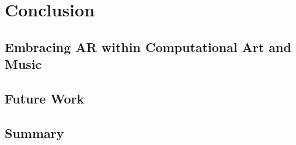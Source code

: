 \chapter{Conclusion}
\label{sec: conclusion}
\epigraph{\emph{}}{}

\section{Embracing AR within Computational Art and Music} \label{sec: conclusion-}
\section{Future Work} \label{sec: conclusion-futurework}
\section{Summary} \label{sec: conclusion-summary}